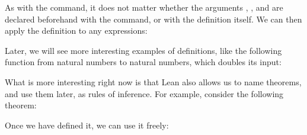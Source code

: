 \documentclass[letterpaper,10pt,english]{sphinxmanual}
\begin{document}
\sphinxAtStartPar
As with the  command, it does not matter whether the arguments , , and  are declared beforehand with the  command, or with the definition itself. We can then apply the definition to any expressions:

\begin{sphinxVerbatim}[commandchars=\\\{\}]
      

          
\end{sphinxVerbatim}

\sphinxAtStartPar
Later, we will see more interesting examples of definitions, like the following function from natural numbers to natural numbers, which doubles its input:

\begin{sphinxVerbatim}[commandchars=\\\{\}]
 

          
\end{sphinxVerbatim}

\sphinxAtStartPar
What is more interesting right now is that Lean also allows us to name theorems, and use them later, as rules of inference. For example, consider the following theorem:

\begin{sphinxVerbatim}[commandchars=\\\{\}]
              
       
\end{sphinxVerbatim}

\sphinxAtStartPar
Once we have defined it, we can use it freely:
\end{document}
